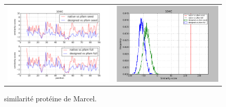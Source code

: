 \documentclass[a4paper,12pt]{article}
\begin{document}
\begin{figure}[t]
\begin{tabular}{cc}
       \includegraphics[width=8.45cm]{gen_08032012/1O4C/ph/graph_simil_bypos.png} &
       \includegraphics[width=8.45cm]{gen_08032012/1O4C/ph/graph_simil_byseq.png} \\

     \end{tabular}

     \caption{similarité protéine de Marcel.}
   \end{figure}
\end{document}
